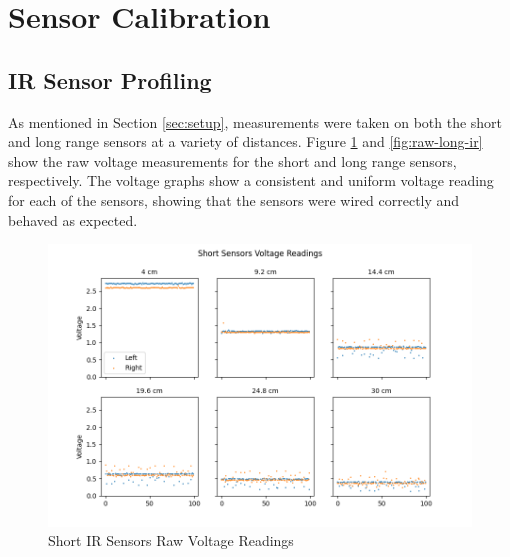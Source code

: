 \documentclass[12pt]{article}
\begin{document}
\section{Sensor Calibration} \label{sec:calib}

\subsection{IR Sensor Profiling} \label{sec:ir-calib}

As mentioned in Section \ref{sec:setup}, measurements were taken on both the short and long range sensors at a variety of distances. Figure \ref{fig:raw-short-ir} and \ref{fig:raw-long-ir} show the raw voltage measurements for the short and long range sensors, respectively. The voltage graphs show a consistent and uniform voltage reading for each of the sensors, showing that the sensors were wired correctly and behaved as expected.

\begin{figure}[H]
    \centering
    \includegraphics[width=\linewidth]{images/Short Sensors Voltage Readings.png}
    \caption{Short IR Sensors Raw Voltage Readings}
    \label{fig:raw-short-ir} %
\end{figure}
\end{document}

